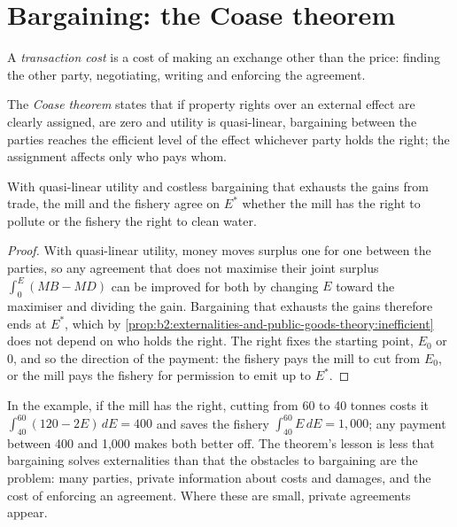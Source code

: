 \section{Bargaining: the Coase theorem}\label{sec:b2:externalities-and-public-goods-theory:coase}

\begin{definition}\label{def:b2:externalities-and-public-goods-theory:transaction-cost}
A \emph{transaction cost} is a cost of making an exchange other than the price: finding the
other party, negotiating, writing and enforcing the agreement.
\end{definition}

\begin{definition}\label{def:b2:externalities-and-public-goods-theory:coase}
The \emph{Coase theorem} states that if property rights over an external effect are clearly
assigned,  are zero and utility is quasi-linear, bargaining between the parties reaches the efficient
level of the effect whichever party holds the right; the assignment affects only who pays whom.
\end{definition}

\begin{proposition}\label{prop:b2:externalities-and-public-goods-theory:coase}
With quasi-linear utility and costless bargaining that exhausts the gains from trade, the mill and the fishery agree on $E^*$
whether the mill has the right to pollute or the fishery the right to clean water.
\end{proposition}

\begin{proof}
With quasi-linear utility, money moves surplus one for one between the parties, so any agreement that does not maximise
their joint surplus $\int_0^E (\mathit{MB} - \mathit{MD})$ can be improved for both by changing $E$ toward the maximiser and dividing the gain. Bargaining
that exhausts the gains therefore ends at $E^*$, which by \cref{prop:b2:externalities-and-public-goods-theory:inefficient} does not depend on who
holds the right. The right fixes the starting point, $E_0$ or 0, and so the direction of the payment: the fishery pays the
mill to cut from $E_0$, or the mill pays the fishery for permission to emit up to $E^*$.
\end{proof}

In the example, if the mill has the right, cutting from 60 to 40 tonnes costs it $\int_{40}^{60}(120 - 2E)\,dE = 400$ and saves the fishery
$\int_{40}^{60}E\,dE = 1{,}000$; any payment between 400 and 1{,}000 makes both better off. The theorem's lesson is less that bargaining
solves externalities than that the obstacles to bargaining are the problem: many parties, private information about
costs and damages, and the cost of enforcing an agreement. Where these are small, private agreements appear.

